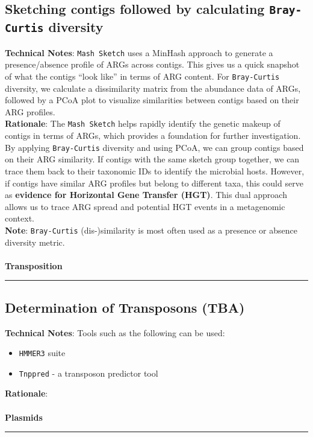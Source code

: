 \documentclass[11pt]{report}
\begin{document}
\subsection{Sketching contigs followed by calculating \texttt{Bray-Curtis} diversity}
\textbf{Technical Notes}: \texttt{Mash Sketch} uses a MinHash approach to generate a presence/absence profile of ARGs across contigs. This gives us a quick snapshot of what the contigs “look like” in terms of ARG content. For \texttt{Bray-Curtis} diversity, we calculate a dissimilarity matrix from the abundance data of ARGs, followed by a PCoA plot to visualize similarities between contigs based on their ARG profiles. \\
\textbf{Rationale}: The \texttt{Mash Sketch} helps rapidly identify the genetic makeup of contigs in terms of ARGs, which provides a foundation for further investigation. By applying \texttt{Bray-Curtis} diversity and using PCoA, we can group contigs based on their ARG similarity. If contigs with the same sketch group together, we can trace them back to their taxonomic IDs to identify the microbial hosts. However, if contigs have similar ARG profiles but belong to different taxa, this could serve as \textbf{evidence for \textbf{Horizontal Gene Transfer (HGT)}}. This dual approach allows us to trace ARG spread and potential HGT events in a metagenomic context. \\
\textbf{Note}: \texttt{Bray-Curtis} (dis-)similarity is most often used as a presence or absence diversity metric.
\\
\\ 
\textbf{Transposition} \\
\rule{\linewidth}{0.5mm}

\subsection{Determination of Transposons (TBA)}
\textbf{Technical Notes}: Tools such as the following can be used:
\begin{itemize}
	\item \texttt{HMMER3} suite
	\item \texttt{Tnppred} - a transposon predictor tool
\end{itemize}

\textbf{Rationale}:  %
\\
\\ 
\textbf{Plasmids} \\
\rule{\linewidth}{0.5mm}
\end{document}
